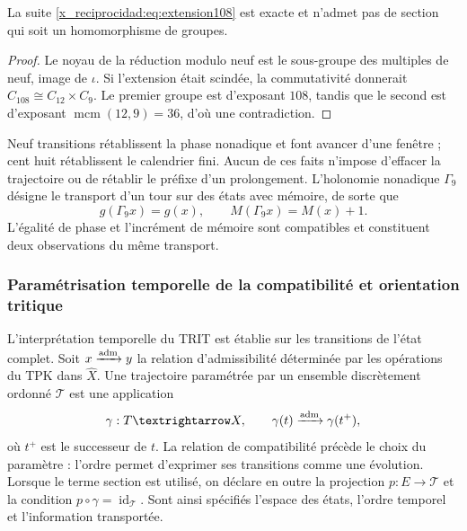 \begin{proposition}
La suite \eqref{x_reciprocidad:eq:extension108} est exacte et n’admet pas de section qui soit un homomorphisme de groupes.
\end{proposition}
\begin{proof}
Le noyau de la réduction modulo neuf est le sous-groupe des multiples de neuf, image de \(\iota\). Si l’extension était scindée, la commutativité donnerait \(C_{108}\cong C_{12}\times C_9\). Le premier groupe est d’exposant \(108\), tandis que le second est d’exposant \(\operatorname{mcm}(12,9)=36\), d’où une contradiction.
\end{proof}

Neuf transitions rétablissent la phase nonadique et font avancer d’une fenêtre ; cent huit rétablissent le calendrier fini. Aucun de ces faits n’impose d’effacer la trajectoire ou de rétablir le préfixe d’un prolongement. L’holonomie nonadique \(\Gamma_9\) désigne le transport d’un tour sur des états avec mémoire, de sorte que
\begin{equation}
 g(\Gamma_9x)=g(x),\qquad M(\Gamma_9x)=M(x)+1.
 \label{x_reciprocidad:eq:holonomia-memoria}
\end{equation}
L’égalité de phase et l’incrément de mémoire sont compatibles et constituent deux observations du même transport.


\subsubsection{Paramétrisation temporelle de la compatibilité et orientation tritique}
\label{x_reciprocidad:trit-temporal-compatibilidad}

L’interprétation temporelle du TRIT est établie sur les transitions de
l’état complet. Soit \(x\xrightarrow{\rm adm}y\) la relation d’admissibilité déterminée
par les opérations du TPK dans \(\widehat X\). Une trajectoire paramétrée
par un ensemble discrètement ordonné \(\mathcal T\) est une application
\[
 \gamma:\mathcal T\longrightarrow\widehat X,\qquad
 \gamma(t)\xrightarrow{\rm adm}\gamma(t^+),
\]
où \(t^+\) est le successeur de \(t\). La relation de compatibilité précède
le choix du paramètre : l’ordre permet d’exprimer ses transitions comme
une évolution. Lorsque le terme section est utilisé, on déclare en outre la
projection \(p:E\to\mathcal T\) et la condition
\(p\circ\gamma=\operatorname{id}_{\mathcal T}\). Sont ainsi spécifiés
l’espace des états, l’ordre temporel et l’information transportée.

